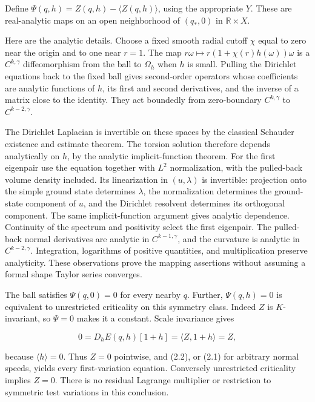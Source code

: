 \documentclass[11pt]{article}
\begin{document}
Define \(\Psi(q,h)=Z(q,h)-\langle Z(q,h)\rangle\), using the appropriate
\(Y\). These are real-analytic maps on an open neighborhood of
\((q_*,0)\) in \(\mathbb R\times X\).

Here are the analytic details. Choose a fixed smooth radial cutoff
\(\chi\) equal to zero near the origin and to one near \(r=1\). The map
\(r\omega\mapsto r(1+\chi(r)h(\omega))\omega\) is a \(C^{k,\gamma}\)
diffeomorphism from the ball to \(\Omega_h\) when \(h\) is small.
Pulling the Dirichlet equations back to the fixed ball gives
second-order operators whose coefficients are analytic functions of
\(h\), its first and second derivatives, and the inverse of a matrix
close to the identity. They act boundedly from zero-boundary
\(C^{k,\gamma}\) to \(C^{k-2,\gamma}\).

The Dirichlet Laplacian is invertible on these spaces by the classical
Schauder existence and estimate theorem. The torsion solution therefore
depends analytically on \(h\), by the analytic implicit-function
theorem. For the first eigenpair use the equation together with \(L^2\)
normalization, with the pulled-back volume density included. Its
linearization in \((u,\lambda)\) is invertible: projection onto the
simple ground state determines \(\lambda\), the normalization determines
the ground-state component of \(u\), and the Dirichlet resolvent
determines its orthogonal component. The same implicit-function argument
gives analytic dependence. Continuity of the spectrum and positivity
select the first eigenpair. The pulled-back normal derivatives are
analytic in \(C^{k-1,\gamma}\), and the curvature is analytic in
\(C^{k-2,\gamma}\). Integration, logarithms of positive quantities, and
multiplication preserve analyticity. These observations prove the
mapping assertions without assuming a formal shape Taylor series
converges.

The ball satisfies \(\Psi(q,0)=0\) for every nearby \(q\). Further,
\(\Psi(q,h)=0\) is equivalent to unrestricted criticality on this
symmetry class. Indeed \(Z\) is \(K\)-invariant, so \(\Psi=0\) makes it
a constant. Scale invariance gives

\[
0=D_hE(q,h)[1+h]=\langle Z,1+h\rangle=Z,
\tag{2.4}
\]

because \(\langle h\rangle=0\). Thus \(Z=0\) pointwise, and (2.2), or
(2.1) for arbitrary normal speeds, yields every first-variation
equation. Conversely unrestricted criticality implies \(Z=0\). There is
no residual Lagrange multiplier or restriction to symmetric test
variations in this conclusion.
\end{document}
